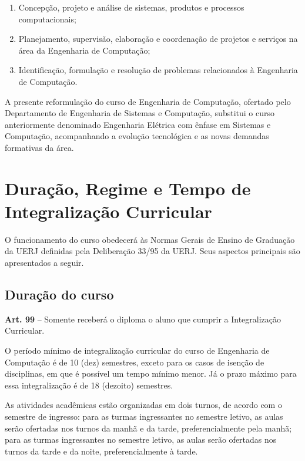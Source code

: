 \begin{enumerate}
    \item Concepção, projeto e análise de sistemas, produtos e processos computacionais;
    \item Planejamento, supervisão, elaboração e coordenação de projetos e serviços na área da Engenharia de Computação;
    \item Identificação, formulação e resolução de problemas relacionados à Engenharia de Computação.
\end{enumerate}

A presente reformulação do curso de Engenharia de Computação, ofertado pelo Departamento de Engenharia de Sistemas e Computação, substitui o curso anteriormente denominado Engenharia Elétrica com ênfase em Sistemas e Computação, acompanhando a evolução tecnológica e as novas demandas formativas da área.

\section{Duração, Regime e Tempo de Integralização Curricular}

O funcionamento do curso obedecerá às Normas Gerais de Ensino de Graduação da UERJ definidas pela Deliberação  33/95 da UERJ. Seus aspectos principais são apresentados a seguir.

\subsection{Duração do curso}
\label{sec:integralizacao}
\begin{itquotation}
    \textbf{Art. 99} -- Somente receberá o diploma o aluno que cumprir a Integralização Curricular.
\end{itquotation}

O período mínimo de integralização curricular do curso de Engenharia de Computação  é de 10 (dez) semestres, exceto para os casos de isenção de disciplinas, em que é possível um tempo mínimo menor. Já o prazo máximo para essa integralização é de 18 (dezoito) semestres.

As atividades acadêmicas estão organizadas em dois turnos, de acordo com o semestre de ingresso: para as turmas ingressantes no  semestre letivo, as aulas serão ofertadas nos turnos da manhã e da tarde, preferencialmente pela manhã; para as turmas ingressantes no  semestre letivo, as aulas serão ofertadas nos turnos da tarde e da noite, preferencialmente à tarde.


